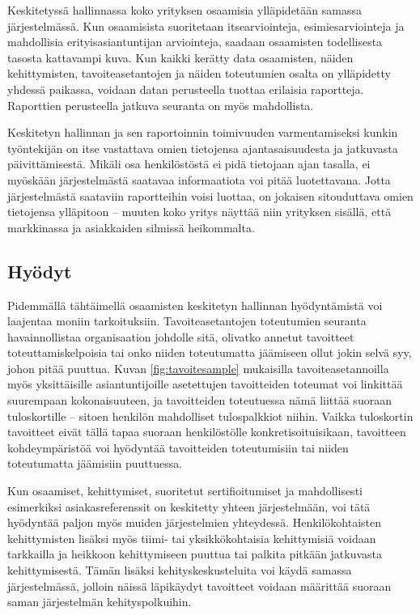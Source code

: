 \documentclass[a4paper,finnish,12pt]{article}
\begin{document}
Keskitetyssä hallinnassa koko yrityksen osaamisia ylläpidetään samassa järjestelmässä. Kun osaamisista suoritetaan itsearviointeja, esimiesarviointeja ja mahdollisia erityisasiantuntijan arviointeja, saadaan osaamisten todellisesta tasosta kattavampi kuva. Kun kaikki kerätty data osaamisten, näiden kehittymisten, tavoiteasetantojen ja näiden toteutumien osalta on ylläpidetty yhdessä paikassa, voidaan datan perusteella tuottaa erilaisia raportteja. Raporttien perusteella jatkuva seuranta on myös mahdollista. 

Keskitetyn hallinnan ja sen raportoinnin toimivuuden varmentamiseksi kunkin työntekijän on itse vastattava omien tietojensa ajantasaisuudesta ja jatkuvasta päivittämisestä. Mikäli osa henkilöstöstä ei pidä tietojaan ajan tasalla, ei myöskään järjestelmästä saatavaa informaatiota voi pitää luotettavana. Jotta järjestelmästä saataviin raportteihin voisi luottaa, on jokaisen sitouduttava omien tietojensa ylläpitoon -- muuten koko yritys näyttää niin yrityksen sisällä, että markkinassa ja asiakkaiden silmissä heikommalta.

\subsection{Hyödyt}

Pidemmällä tähtäimellä osaamisten keskitetyn hallinnan hyödyntämistä voi laajentaa moniin tarkoituksiin. Tavoiteasetantojen toteutumien seuranta havainnollistaa organisaation johdolle sitä, olivatko annetut tavoitteet toteuttamiskelpoisia tai onko niiden toteutumatta jäämiseen ollut jokin selvä syy, johon pitää puuttua. Kuvan \ref{fig:tavoitesample} mukaisilla tavoiteasetannoilla myös yksittäisille asiantuntijoille asetettujen tavoitteiden toteumat voi linkittää suurempaan kokonaisuuteen, ja tavoitteiden toteutuessa nämä liittää suoraan tuloskortille -- sitoen henkilön mahdolliset tulospalkkiot niihin. Vaikka tuloskortin tavoitteet eivät tällä tapaa suoraan henkilöstölle konkretisoituisikaan, tavoitteen kohdeympäristöä voi hyödyntää tavoitteiden toteutumisiin tai niiden toteutumatta jäämisiin puuttuessa.

Kun osaamiset, kehittymiset, suoritetut sertifioitumiset ja mahdollisesti esimerkiksi asiakasreferenssit on keskitetty yhteen järjestelmään, voi tätä hyödyntää paljon myös muiden järjestelmien yhteydessä. Henkilökohtaisten kehittymisten lisäksi myös tiimi- tai yksikkökohtaisia kehittymisiä voidaan tarkkailla ja heikkoon kehittymiseen puuttua tai palkita pitkään jatkuvasta kehittymisestä. Tämän lisäksi kehityskeskusteluita voi käydä samassa järjestelmässä, jolloin näissä läpikäydyt tavoitteet voidaan määrittää suoraan saman järjestelmän kehityspolkuihin.
\end{document}
